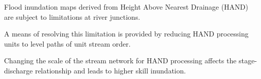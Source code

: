 \documentclass[draft]{dependencies/agujournal2019}
\begin{document}
%
%
 



%
\begin{keypoints}
\item Flood inundation maps derived from Height Above Nearest Drainage (HAND) are subject to limitations at river junctions.
\item A means of resolving this limitation is provided by reducing HAND processing units to level paths of unit stream order.
\item Changing the scale of the stream network for HAND processing affects the stage-discharge relationship and leads to higher skill inundation.
\end{keypoints}
%
 

%
%

%
%
\end{document}
